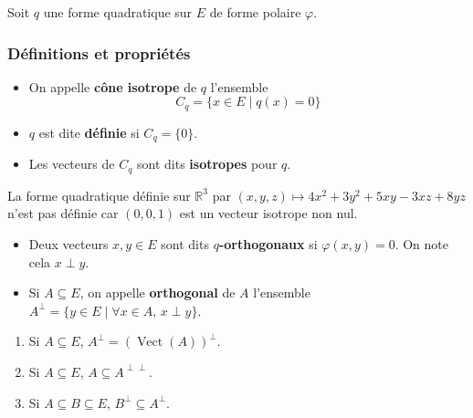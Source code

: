   Soit $q$ une forme quadratique sur $E$ de forme polaire $\varphi$.

  \subsubsection{Définitions et propriétés}

  \begin{definition}
    \begin{itemize}
      \item On appelle \textbf{cône isotrope} de $q$ l'ensemble
      \[ C_q = \{ x \in E \mid q(x) = 0 \} \]
      \item $q$ est dite \textbf{définie} si $C_q = \{ 0 \}$.
      \item Les vecteurs de $C_q$ sont dits \textbf{isotropes} pour $q$.
    \end{itemize}
  \end{definition}


  \begin{example}
    La forme quadratique définie sur $\mathbb{R}^3$ par $(x, y, z) \mapsto 4x^2 + 3y^2 + 5xy - 3xz + 8yz$ n'est pas définie car $(0,0,1)$ est un vecteur isotrope non nul.
  \end{example}


  \begin{definition}
    \begin{itemize}
      \item Deux vecteurs $x, y \in E$ sont dits \textbf{$q$-orthogonaux} si $\varphi(x, y) = 0$. On note cela $x \perp y$.
      \item Si $A \subseteq E$, on appelle \textbf{orthogonal} de $A$ l'ensemble $A^\perp = \{ y \in E \mid \forall x \in A, \, x \perp y \}$.
    \end{itemize}
  \end{definition}

  \begin{proposition}
    \begin{enumerate}[label={\bfseries(\roman*)}]
      \item Si $A \subseteq E$, $A^\perp = (\operatorname{Vect}(A))^\perp$.
      \item Si $A \subseteq E$, $A \subseteq A^{\perp\perp}$.
      \item Si $A \subseteq B \subseteq E$, $B^{\perp} \subseteq A^{\perp}$.
    \end{enumerate}
  \end{proposition}

